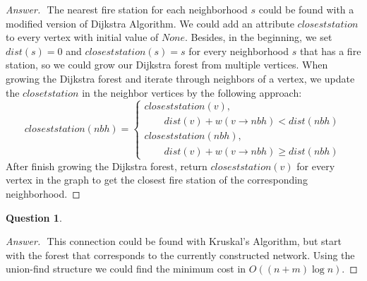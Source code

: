 \documentclass{article}
\theoremstyle{plain}
\newtheorem{question}{Question}
\newenvironment{answer}[1][Answer]
    {\begin{proof}[#1]{$ $}\renewcommand\qedsymbol{$\vartriangle$}}
    {\end{proof}}
\begin{document}
\begin{answer}
     The nearest fire station for each neighborhood $s$ could be found with a modified version of Dijkstra Algorithm. We could add an attribute $closeststation$ to every vertex with initial value of $None$. Besides, in the beginning, we set $dist(s)=0$ and $closeststation(s) = s$ for every neighborhood $s$ that has a fire station, so we could grow our Dijkstra forest from multiple vertices. When growing the Dijkstra forest and iterate through neighbors of a vertex, we update the $closetstation$ in the neighbor vertices by the following approach:
    \begin{equation*}
        closeststation(nbh) =
        \begin{cases}
            closeststation(v), \\
            \quad \quad dist(v) + w(v \rightarrow nbh) < dist(nbh)\\
            closeststation(nbh), \\
            \quad \quad dist(v) + w(v \rightarrow nbh) \geq dist(nbh)
        \end{cases}
    \end{equation*}
    After finish growing the Dijkstra forest, return $closeststation(v)$ for every vertex in the graph to get the closest fire station of the corresponding neighborhood.
\end{answer}

\begin{question}
\end{question}
\begin{answer}
    This connection could be found with Kruskal's Algorithm, but start with the forest that corresponds to the currently constructed network. Using the union-find structure we could find the minimum cost in $O((n+m)\log n)$.
\end{answer}
\end{document}
